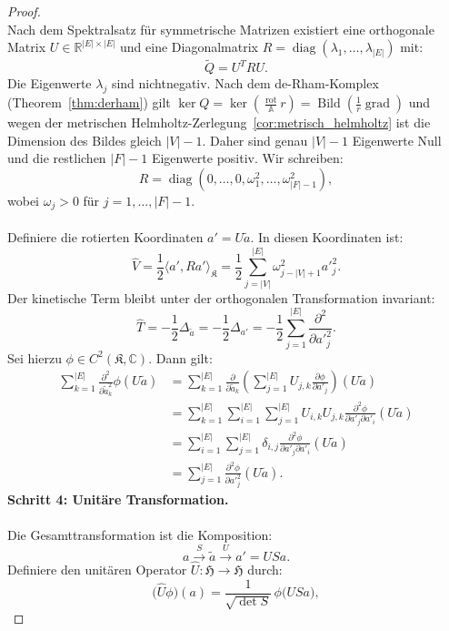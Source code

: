 \documentclass[11pt,a4paper,leqno]{report}
\numberwithin{equation}{chapter}
\begin{document}
\begin{proof}
	\\
	Nach dem Spektralsatz für symmetrische Matrizen existiert eine orthogonale Matrix 
	\(U \in \mathbb{R}^{|E|\times|E|}\) und eine Diagonalmatrix 
	\(R = \operatorname{diag}(\lambda_1,\dots,\lambda_{|E|})\) mit:
	\[
	\tilde{Q} = U^T R U.
	\]
	Die Eigenwerte \(\lambda_j\) sind nichtnegativ. Nach dem de-Rham-Komplex 
	(Theorem~\ref{thm:derham}) gilt \(\ker Q = \ker(\frac{\operatorname{rot}}{\mathbb{A}}r) 
	= \operatorname{Bild}(\frac{1}{r}\operatorname{grad})\) und wegen der metrischen Helmholtz-Zerlegung~\ref{cor:metrisch_helmholtz} ist die Dimension des Bildes gleich \(|V|-1\). Daher sind 
	genau \(|V|-1\) Eigenwerte Null und die restlichen \(|F|-1\) Eigenwerte positiv. 
	Wir schreiben:
	\[
	R = \operatorname{diag}(0,\dots,0,\omega_1^2,\dots,\omega_{|F|-1}^2),
	\]
	wobei \(\omega_j > 0\) für \(j=1,\dots,|F|-1\).\\
	\\
	Definiere die rotierten Koordinaten \(a' = U \tilde{a}\). In diesen Koordinaten ist:
	\[
	\hat{V} = \frac{1}{2}\bigl\langle a', R a'\bigr\rangle_{\mathfrak{K}} 
	= \frac{1}{2}\sum_{j=|V|}^{|E|} \omega_{j-|V|+1}^2 {a'}_j^2.
	\]
	Der kinetische Term bleibt unter der orthogonalen Transformation invariant:
	\[
	\hat{T} = -\frac{1}{2}\Delta_{\tilde{a}} = -\frac{1}{2}\Delta_{a'} 
	= -\frac{1}{2}\sum_{j=1}^{|E|} \frac{\partial^2}{\partial {a'}_j^2}.
	\]
	Sei hierzu \(\phi\in C^2(\mathfrak{K},\mathbb{C})\). Dann gilt:
	\begin{align*}
		\sum_{k=1}^{|E|}\frac{\partial^2}{\partial \tilde{a}_k^{2}}\phi(U\tilde{a})
		&=\sum_{k=1}^{|E|}\frac{\partial}{\partial \tilde{a}_k}
		\left(\sum_{j=1}^{|E|}U_{j,k}\frac{\partial\phi}{\partial a'_j}\right)(U\tilde{a})\\
		&=\sum_{k=1}^{|E|}\sum_{i=1}^{|E|}\sum_{j=1}^{|E|}
		U_{i,k}U_{j,k}\frac{\partial^2\phi}{\partial a'_j\partial a'_i}(U\tilde{a})\\
		&=\sum_{i=1}^{|E|}\sum_{j=1}^{|E|}\delta_{i,j}
		\frac{\partial^2\phi}{\partial a'_j\partial a'_i}(U\tilde{a})\\
		&=\sum_{j=1}^{|E|}\frac{\partial^2\phi}{\partial {a'}_j^2}(U\tilde{a}).
	\end{align*}
	\textbf{Schritt 4: Unitäre Transformation.}\\
	\\
	Die Gesamttransformation ist die Komposition:
	\[
	a \xrightarrow{S} \tilde{a} \xrightarrow{U} a' = U S a.
	\]
	Definiere den unitären Operator \(\hat{U}: \mathfrak{H} \to \mathfrak{H}\) durch:
	\[
	\bigl(\hat{U}\phi\bigr)(a) = \frac{1}{\sqrt{\det S}} \, \phi\bigl(US a\bigr), 
\]
\end{proof}
\end{document}
